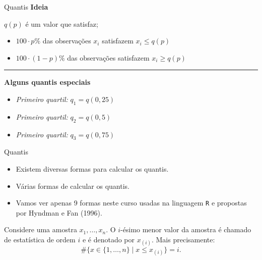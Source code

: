 \documentclass[
  10pt,
  ignorenonframetext,
]{beamer}
\providecommand{\tightlist}{%
  \setlength{\itemsep}{0pt}\setlength{\parskip}{0pt}}\usepackage{longtable,booktabs,array}
\newcommand*{\regrafina}{\rule{\textwidth}{0.5pt}}
\begin{document}
\begin{frame}{Quantis}
\protect\hypertarget{quantis}{}
\textbf{Ideia}

\(q(p)\) é um valor que satisfaz;

\begin{itemize}
\tightlist
\item
  \(100 \cdot p\%\) das observações \(x_i\) satisfazem \(x_i \leq q(p)\)
\item
  \(100 \cdot (1-p)\%\) das observações satisfazem \(x_i \geq q(p)\)
\end{itemize}

\regrafina

\textbf{Alguns quantis especiais}

\begin{itemize}
\tightlist
\item
  \emph{Primeiro quartil:} \(q_1 = q(0,25)\)
\item
  \emph{Primeiro quartil:} \(q_2 = q(0,5)\)
\item
  \emph{Primeiro quartil:} \(q_3 = q(0,75)\)
\end{itemize}
\end{frame}

\begin{frame}[fragile]{Quantis}
\protect\hypertarget{quantis-1}{}
\begin{itemize}
\tightlist
\item
  Existem diversas formas para calcular os quantis.
\item
  Várias formas de calcular os quantis.
\item
  Vamos ver apenas 9 formas neste curso usadas na linguagem \texttt{R} e
  propostas por Hyndman e Fan (1996).
\end{itemize}

Considere uma amostra \(x_1,\dots, x_n\). O \(i\)-ésimo menor valor da
amostra é chamado de estatística de ordem \(i\) e é denotado por
\(x_{(i)}\). Mais precisamente: \[
\#\{x \in\{1, \dots, n\} \mid x \leq x_{(i)} \}=i.
\]
\end{frame}
\end{document}

